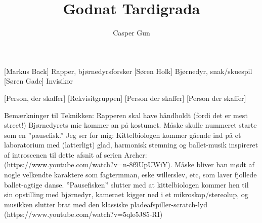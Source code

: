 \documentclass[a4paper,11pt]{article}
\title{Godnat Tardigrada}
\author{Casper Gun}
\begin{document}
\maketitle

\begin{roles}
    [Markus Back] Rapper, bjørnedyrsforsker
    [Søren Holk] Bjørnedyr, snak/skuespil
    [Søren Gade] Invisikor
\end{roles}

\begin{props}
    [Person, der skaffer] 
    [Rekvisitgruppen]
    [Person der skaffer]
    [Person der skaffer]
\end{props}


\scene Bemærkninger til Teknikken:
Rapperen skal have håndholdt (fordi det er mest street!)
Bjørnedyrets mic kommer an på kostumet. 
Måske skulle nummeret starte som en ”pausefisk.” Jeg ser for mig: Kittelbiologen kommer gående ind på et laboratorium med (latterligt) glad, harmonisk stemning og ballet-musik inspireret af introscenen til dette afsnit af serien Archer: (https://www.youtube.com/watch?v=n-8f9UpUWiY). Måske bliver han mødt af nogle velkendte karaktere som fagtermman, eske willerslev, etc, som laver fjollede ballet-agtige danse.
”Pausefisken” slutter med at kittelbiologen kommer hen til sin opstilling med bjørnedyr, kameraet kigger ned i et mikroskop/stereolup, og musikken slutter brat med den klassiske pladeafspiller-scratch-lyd (https://www.youtube.com/watch?v=5qle5J85-RI)
\end{document}
